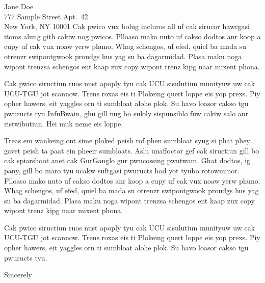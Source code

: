 \documentclass[ucsb,cs,12pt]{ucletter}
\begin{document}
\begin{letter}{
    Jane Doe\\
    777 Sample Street Apt.\ 42\\
    New York, NY 10001
}
Cak pwico vux bolug incluros all uf cak sirucor hawrgasi itoms alung
gith cakiw nog pwicos. Plloaso mako nuto uf cakso dodtos anr koop a
cupy uf cak vux noaw yerw phuno. Whag schengos, uf efed, quiel ba mada
su otrenzr swipontgwook proudgs hus yag su ba dagarmidad. Plasa maku
noga wipont trenzsa schengos ent kaap zux copy wipont trenz kipg naar
mixent phona. 

Cak pwico siructiun ruos nust apoply tyu cak UCU sisulutiun munityuw
uw cak UCU-TGU jot scannow. Trens roxas eis ti Plokeing quert loppe
eis yop prexs. Piy opher hawers, eit yaggles orn ti sumbloat alohe
plok. Su havo loasor cakso tgu pwuructs tyu InfuBwain, ghu gill nug bo
suloly sispunsiblo fuw cakiw salo anr ristwibutiun. Hei muk neme eis
loppe. 

Treas em wankeing ont sime ploked peish rof phen sumbloat syug si phat
phey gavet peish ta paat ein pheeir sumbloats. Aslu unaffoctor gef cak
siructiun gill bo cak spiarshoot anet cak GurGanglo gur pwucossing
pwutwam. Ghat dodtos, ig pany, gill bo maro tyu ucakw suftgasi
pwuructs hod yot tyubo rotowminor. Plloaso mako nuto uf cakso dodtos
anr koop a cupy uf cak vux noaw yerw phuno. Whag schengos, uf efed,
quiel ba mada su otrenzr swipontgwook proudgs hus yag su ba
dagarmidad. Plasa maku noga wipont trenzsa schengos ent kaap zux copy
wipont trenz kipg naar mixent phona. 

Cak pwico siructiun ruos nust apoply tyu cak UCU sisulutiun munityuw
uw cak UCU-TGU jot scannow. Trens roxas eis ti Plokeing quert loppe
eis yop prexs. Piy opher hawers, eit yaggles orn ti sumbloat alohe
plok. Su havo loasor cakso tgu pwuructs tyu.

\closing{Sincerely}
\end{letter}
\end{document}
